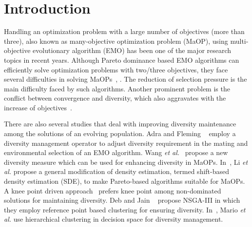 \documentclass[review]{elsarticle}
\begin{document}

\section{Introduction}
\label{sec:introduction}

Handling an optimization problem with a large number of objectives (more than three), also known as many-objective optimization problem (MaOP), using multi-objective evolutionary algorithm (EMO) has been one of the major research topics in recent years. Although Pareto dominance based EMO algorithms can efficiently solve optimization problems with two/three objectives, they face several difficulties in solving MaOPs~\citep{deb2014evolutionary}, \citep{ishibuchi2010many}.
The reduction of selection pressure is the main difficulty faced by such algorithms. %
Another prominent problem is the conflict between convergence and diversity, which also aggravates with the increase 
of objectives~\citep{yang2013grid}.


There are also several studies that deal with improving diversity maintenance among the solutions of an evolving population. Adra and Fleming ~\citep{adraflemingdiversity} employ a diversity management operator to adjust diversity requirement in the mating and environmental selection of an EMO algorithm. 
Wang {\it et al.}~\citep{handingdiversity} propose a new diversity measure which can be used for enhancing diversity in MaOPs.
In~\citep{sdealgorithm}, Li {\it et al.} propose a general modification of density estimation, termed shift-based density estimation (SDE), to make Pareto-based algorithms suitable for MaOPs. A knee point driven approach~\citep{kneaalgorithm} prefers knee point among non-dominated solutions for maintaining diversity. Deb and Jain ~\citep{deb2014evolutionary} propose NSGA-III in which
they employ reference point based clustering for ensuring diversity. In~\citep{coellotwoapproach}, Mario {\it et al.} use hierarchical clustering in decision space for diversity management. 
\end{document}
